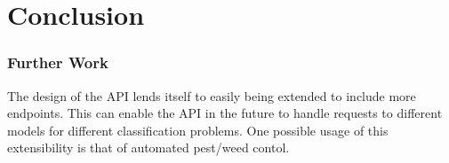 \chapter{Conclusion}
\label{conclusion}
  \subsection{Further Work}
    The design of the API lends itself to easily being extended to include more endpoints. This can enable the API in the future to handle requests to different models for different classification problems. One possible usage of this extensibility is that of automated pest/weed contol. 

